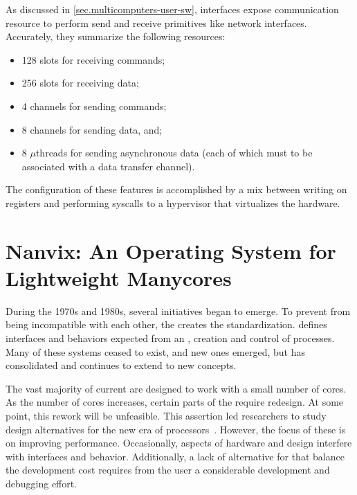 	As discussed in \autoref{sec.multicomputers-user-sw}, \noc interfaces
	expose communication resource to perform send and receive primitives
	like network interfaces.
	Accurately, they summarize the following resources:

	\begin{itemize}
		\item 128 slots for receiving commands;
		\item 256 slots for receiving data;
		\item 4 channels for sending commands;
		\item 8 channels for sending data, and;
		\item 8 $\mu$threads for sending asynchronous data (each of which must
			to be associated with a data transfer channel).
	\end{itemize}

	The configuration of these features is accomplished by a mix between
	writing on \dma registers and performing syscalls to a hypervisor
	that virtualizes the \mppa hardware.

\section{Nanvix: An Operating System for Lightweight Manycores}
\label{sec.nanvix}

	During the 1970s and 1980s, several \os initiatives began to emerge.
	To prevent \oss from being incompatible with each other, the \ieee creates
	the \posix standardization.
	\posix defines interfaces and behaviors expected from an \os, \eg creation
	and control of processes.
	Many of these systems ceased to exist, and new ones emerged, but \posix has
	consolidated and continues to extend to new concepts.

	The vast majority of current \oss are designed to work with a small number of cores.
	As the number of cores increases, certain parts of the \os require redesign.
	At some point, this rework will be unfeasible.
	This assertion led researchers to study design alternatives for the new era of
	processors~\cite{wentzlaff_factored_2009, baumann_multikernel:_2009, Wisniewski2014}.
	However, the focus of these \oss is on improving performance.
	Occasionally, aspects of hardware and design interfere with \os interfaces and behavior.
	Additionally, a lack of alternative \oss for \lightweight \manycores that balance the
	development cost requires from the user a considerable development and debugging effort.

